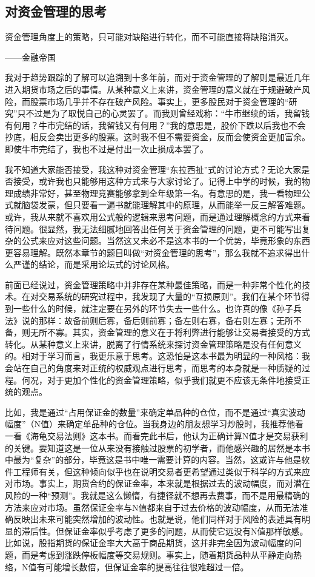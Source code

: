 \subsection{对资金管理的思考}

{\kaishu
资金管理角度上的策略，只可能对缺陷进行转化，而不可能直接将缺陷消灭。

\hfill ——金融帝国
}

我对于趋势跟踪的了解可以追溯到十多年前，而对于资金管理的了解则是最近几年进入期货市场之后的事情。从某种意义上来讲，资金管理的意义就在于规避破产风险，而股票市场几乎并不存在破产风险。事实上，更多股民对于资金管理的“研究”只不过是为了取悦自己的心灵罢了。而我则曾经戏称：“牛市继续的话，我留钱有何用？牛市完结的话，我留钱又有何用？”我的意思是，股价下跌以后我也不会抄底，相反会卖出更多的股票。这时我不但不需要资金，反而会使资金更加富余。即使牛市完结了，我也不过是付出一次止损成本罢了。

我不知道大家能否接受，我这种对资金管理“东拉西扯”式的讨论方式？无论大家是否接受，或许我也只能够用这种方式来与大家讨论了。记得上中学的时候，我的物理成绩非常好，甚至物理竞赛能够拿到全年级第一名。有意思的是，我一看物理公式就脑袋发蒙，但只要看一遍书就能理解其中的原理，从而能举一反三解答难题。或许，我从来就不喜欢用公式般的逻辑来思考问题，而是通过理解概念的方式来看待问题。很显然，我无法细腻地回答出任何关于资金管理的问题，更不可能写出复杂的公式来应对这些问题。当然这又未必不是这本书的一个优势，毕竟形象的东西更容易理解。既然本章节的题目叫做“对资金管理的思考”，那么我就不追求得出什么严谨的结论，而是采用论坛式的讨论风格。

前面已经说过，资金管理策略中并非存在某种最佳策略，而是一种非常个性化的技术。在对交易系统的研究过程中，我发现了大量的“互损原则”。我们在某个环节得到一些什么的时候，就注定要在另外的环节失去一些什么。也许真的像《孙子兵法》说的那样：故备前则后寡，备后则前寡；备左则右寡，备右则左寡；无所不备，则无所不寡。其实，资金管理的意义在于将利弊进行能够让交易者接受的方式转化。从某种意义上来讲，脱离了行情系统来探讨资金管理策略是没有任何意义的。相对于学习而言，我更乐意于思考。这恐怕是这本书最为明显的一种风格：我会站在自己的角度来对正统的权威观点进行思考，而思考的本身就是一种质疑的过程。何况，对于更加个性化的资金管理策略，似乎我们就更不应该无条件地接受正统的观点。

比如，我是通过“占用保证金的数量”来确定单品种的仓位，而不是通过“真实波动幅度”（N值）来确定单品种的仓位。当我身边的朋友想学习炒股时，我推荐他看一看《海龟交易法则》这本书。而看完此书后，他认为正确计算N值才是交易获利的关键。要知道这是一位从来没有接触过股票的初学者，而他感兴趣的居然是本书中最为“复杂”的部分，毕竟这是书中唯一需要计算的内容。当然，这或许与他是软件工程师有关，但这种倾向似乎也在说明交易者更希望通过类似于科学的方式来应对市场。事实上，期货合约的保证金率，本来就是根据过去的波动幅度，而对潜在风险的一种“预测”。我就是这么懒惰，有捷径就不想再去费事，而不是用最精确的方法来应对市场。虽然保证金率与N值都来自于过去价格的波动幅度，从而无法准确反映出未来可能突然增加的波动性。也就是说，他们同样对于风险的表述具有明显的滞后性。但保证金率似乎考虑了更多的问题，从而使它远没有N值那样敏感。比如说，股指期货的保证金率大大高于商品期货，这并非完全因为波动幅度的问题，而是考虑到涨跌停板幅度等交易规则。事实上，随着期货品种从平静走向热络，N值有可能增长数倍，但保证金率的提高往往很难超过一倍。

